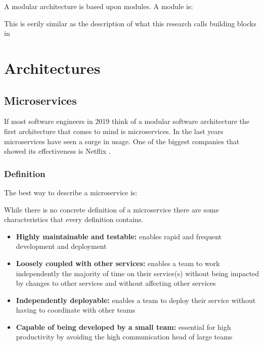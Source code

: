 A modular architecture is based upon modules. A module is:

This is eerily similar as the description of what this research calls building blocks in 

\section{Architectures}
\label{sec:Architectures}

\subsection{Microservices}
If most software engineers in 2019 think of a modular software architecture the first architecture that comes to mind is microservices. In the last years microservices have seen a surge in usage. One of the biggest companies that showed its effectiveness is Netflix \cite{microservicesNetflix}.

\subsubsection{Definition}
The best way to describe a microservice is:

While there is no concrete definition of a microservice there are some characteristics that
every definition contains.
\begin{itemize}
        \item \textbf{Highly maintainable and testable:} enables rapid and frequent development and deployment

        \item \textbf{Loosely coupled with other services:} enables a team to work independently the majority of time on their service(s) without being impacted by changes to other services and without affecting other services

        \item \textbf{Independently deployable:} enables a team to deploy their service without having to coordinate with other teams

        \item \textbf{Capable of being developed by a small team:} essential for high productivity by avoiding the high communication head of large teams \cite{microservicesCharactaristics}
\end{itemize}

